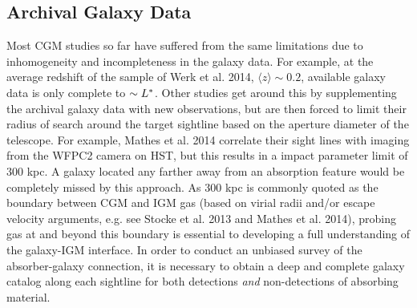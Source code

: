 \documentclass[iop]{emulateapj-rtx4}
\begin{document}
\subsection{Archival Galaxy Data}
Most CGM studies so far have suffered from the same limitations due to inhomogeneity and incompleteness in the galaxy data. For example, at the average redshift of the sample of Werk et al. 2014, $\langle z \rangle \sim 0.2$, available galaxy data is only complete to $\sim L^{\**}$. Other studies get around this by supplementing the archival galaxy data with new observations, but are then forced to limit their radius of search around the target sightline based on the aperture diameter of the telescope. For example, Mathes et al. 2014 correlate their sight lines with imaging from the WFPC2 camera on HST, but this results in a impact parameter limit of 300 kpc. A galaxy located any farther away from an absorption feature would be completely missed by this approach. As 300 kpc is commonly quoted as the boundary between CGM and IGM gas (based on virial radii and/or escape velocity arguments, e.g. see Stocke et al. 2013 and Mathes et al. 2014), probing gas at and beyond this boundary is essential to developing a full understanding of the galaxy-IGM interface. In order to conduct an unbiased survey of the absorber-galaxy connection, it is necessary to obtain a deep and complete galaxy catalog along each sightline for both detections \textit{and} non-detections of absorbing material.
\end{document}
